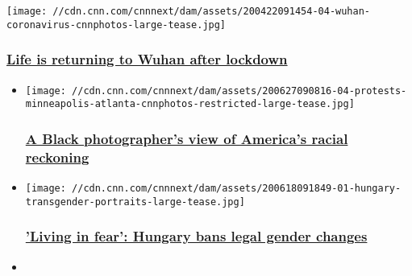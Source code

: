 \begin{itemize}
  \texttt{[image: //cdn.cnn.com/cnnnext/dam/assets/200422091454-04-wuhan-coronavirus-cnnphotos-large-tease.jpg]}

  \hypertarget{life-is-returning-to-wuhan-after-lockdown}{%
  \subsubsection{\texorpdfstring{\href{https://www.cnn.com/interactive/2020/04/world/wuhan-coronavirus-cnnphotos/index.html}{Life
  is returning to Wuhan after
  lockdown}}{Life is returning to Wuhan after lockdown}}\label{life-is-returning-to-wuhan-after-lockdown}}
\end{itemize}

\begin{itemize}
\item
  \href{https://www.cnn.com/interactive/2020/06/us/protests-minneapolis-atlanta-cnnphotos/index.html}{}

  \texttt{[image: //cdn.cnn.com/cnnnext/dam/assets/200627090816-04-protests-minneapolis-atlanta-cnnphotos-restricted-large-tease.jpg]}

  \hypertarget{a-black-photographers-view-of-americas-racial-reckoning}{%
  \subsubsection{\texorpdfstring{\href{https://www.cnn.com/interactive/2020/06/us/protests-minneapolis-atlanta-cnnphotos/index.html}{A
  Black photographer's view of America's racial
  reckoning}}{A Black photographer's view of America's racial reckoning}}\label{a-black-photographers-view-of-americas-racial-reckoning}}
\item
  \href{https://www.cnn.com/interactive/2020/06/world/hungary-transgender-portraits-cnnphotos/index.html}{}

  \texttt{[image: //cdn.cnn.com/cnnnext/dam/assets/200618091849-01-hungary-transgender-portraits-large-tease.jpg]}

  \hypertarget{living-in-fear-hungary-bans-legal-gender-changes}{%
  \subsubsection{\texorpdfstring{\href{https://www.cnn.com/interactive/2020/06/world/hungary-transgender-portraits-cnnphotos/index.html}{'Living
  in fear': Hungary bans legal gender
  changes}}{'Living in fear': Hungary bans legal gender changes}}\label{living-in-fear-hungary-bans-legal-gender-changes}}
\item
  \href{https://www.cnn.com/interactive/2020/05/health/coronavirus-pregnancy-birth-cnnphotos/index.html}{}


\end{itemize}
